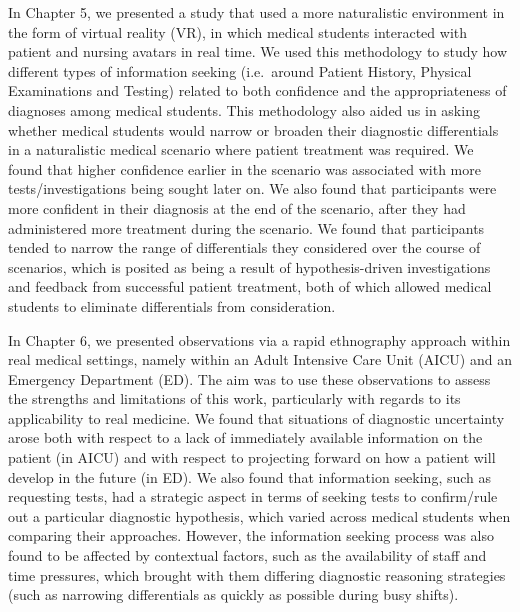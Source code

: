 \documentclass[a4paper, nobind]{templates/ociamthesis}
\begin{document}
In Chapter 5, we presented a study that used a more naturalistic environment in the form of virtual reality (VR), in which medical students interacted with patient and nursing avatars in real time. We used this methodology to study how different types of information seeking (i.e.~around Patient History, Physical Examinations and Testing) related to both confidence and the appropriateness of diagnoses among medical students. This methodology also aided us in asking whether medical students would narrow or broaden their diagnostic differentials in a naturalistic medical scenario where patient treatment was required. We found that higher confidence earlier in the scenario was associated with more tests/investigations being sought later on. We also found that participants were more confident in their diagnosis at the end of the scenario, after they had administered more treatment during the scenario. We found that participants tended to narrow the range of differentials they considered over the course of scenarios, which is posited as being a result of hypothesis-driven investigations and feedback from successful patient treatment, both of which allowed medical students to eliminate differentials from consideration.

In Chapter 6, we presented observations via a rapid ethnography approach within real medical settings, namely within an Adult Intensive Care Unit (AICU) and an Emergency Department (ED). The aim was to use these observations to assess the strengths and limitations of this work, particularly with regards to its applicability to real medicine. We found that situations of diagnostic uncertainty arose both with respect to a lack of immediately available information on the patient (in AICU) and with respect to projecting forward on how a patient will develop in the future (in ED). We also found that information seeking, such as requesting tests, had a strategic aspect in terms of seeking tests to confirm/rule out a particular diagnostic hypothesis, which varied across medical students when comparing their approaches. However, the information seeking process was also found to be affected by contextual factors, such as the availability of staff and time pressures, which brought with them differing diagnostic reasoning strategies (such as narrowing differentials as quickly as possible during busy shifts).
\end{document}
